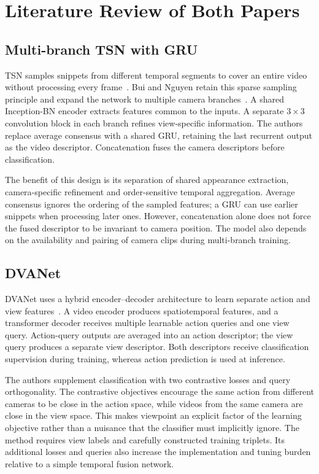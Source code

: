 \documentclass[runningheads]{llncs}
\begin{document}
\section{Literature Review of Both Papers}
\subsection{Multi-branch TSN with GRU}
TSN samples snippets from different temporal segments to cover an entire video without processing every frame~\cite{tsn}. Bui and Nguyen retain this sparse sampling principle and expand the network to multiple camera branches~\cite{bui}. A shared Inception-BN encoder extracts features common to the inputs. A separate $3\times3$ convolution block in each branch refines view-specific information. The authors replace average consensus with a shared GRU, retaining the last recurrent output as the video descriptor. Concatenation fuses the camera descriptors before classification.

The benefit of this design is its separation of shared appearance extraction, camera-specific refinement and order-sensitive temporal aggregation. Average consensus ignores the ordering of the sampled features; a GRU can use earlier snippets when processing later ones. However, concatenation alone does not force the fused descriptor to be invariant to camera position. The model also depends on the availability and pairing of camera clips during multi-branch training.

\subsection{DVANet}
DVANet uses a hybrid encoder--decoder architecture to learn separate action and view features~\cite{dva}. A video encoder produces spatiotemporal features, and a transformer decoder receives multiple learnable action queries and one view query. Action-query outputs are averaged into an action descriptor; the view query produces a separate view descriptor. Both descriptors receive classification supervision during training, whereas action prediction is used at inference.

The authors supplement classification with two contrastive losses and query orthogonality. The contrastive objectives encourage the same action from different cameras to be close in the action space, while videos from the same camera are close in the view space. This makes viewpoint an explicit factor of the learning objective rather than a nuisance that the classifier must implicitly ignore. The method requires view labels and carefully constructed training triplets. Its additional losses and queries also increase the implementation and tuning burden relative to a simple temporal fusion network.
\end{document}
